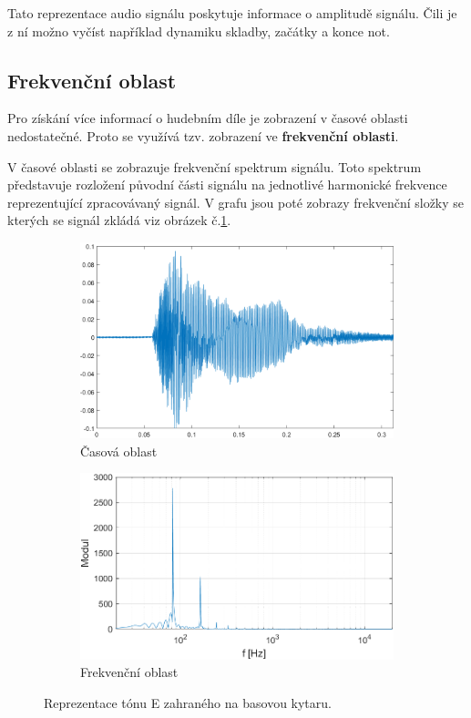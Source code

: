   Tato reprezentace audio signálu poskytuje informace o amplitudě signálu. Čili je z ní možno vyčíst například dynamiku skladby, začátky a konce not.
  
  \subsection{Frekvenční oblast}
  Pro získání více informací o hudebním díle je zobrazení v časové oblasti nedostatečné.
  Proto se využívá tzv. zobrazení ve \textbf{frekvenční oblasti}.

  V časové oblasti se zobrazuje frekvenční spektrum signálu.
  Toto spektrum představuje rozložení původní části signálu na jednotlivé harmonické frekvence reprezentující zpracovávaný signál.
  V grafu jsou poté zobrazy frekvenční složky se kterých se signál zkládá viz obrázek č.\ref*{fig:Bass_tone}.

  \begin{figure}[H]
    \centering
    \begin{subfigure}[b]{0.8\linewidth}
        \includegraphics[width = \linewidth]{obrazky/Piano_tone_waveform.png}
        \caption{Časová oblast}
    \end{subfigure}
    \begin{subfigure}[b]{0.8\linewidth}
        \includegraphics[width = \linewidth]{obrazky/Bass_tone_spectrum.png}
        \caption{Frekvenční oblast}
    \end{subfigure}
    \caption{Reprezentace tónu E zahraného na basovou kytaru.}
    \label{fig:Bass_tone}
\end{figure}
  
